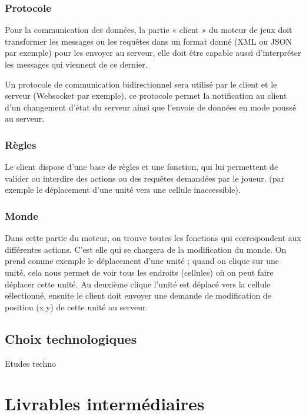 \documentclass[a4paper,10pt]{report}
\begin{document}
      \subsection{Protocole}

	Pour la communication des données, la partie « client » du moteur de jeux doit transformer les messages ou les requêtes dans un format donné (XML ou JSON par exemple) pour les envoyer au serveur, elle doit être capable aussi d’interpréter les messages qui viennent de ce dernier.

	Un protocole de communication bidirectionnel sera utilisé par le client et le serveur (Websocket par exemple), ce protocole permet la notification au client d’un changement d’état du serveur ainsi que l’envoie de données en mode poussé au serveur.

      \subsection{Règles}

	Le client dispose d’une base de règles et une fonction, qui lui permettent de valider ou interdire des actions ou des requêtes demandées par le joueur. (par exemple le déplacement d’une unité vers une cellule inaccessible).

      \subsection{Monde}

	Dans cette partie du moteur, on trouve toutes les fonctions qui correspondent aux différentes actions. C'est elle qui se chargera de la modification du monde. On prend comme exemple le déplacement d’une unité ; quand on clique sur une unité, cela nous permet de voir tous les endroits (cellules) où on peut faire déplacer cette unité. Au deuxième clique l’unité est déplacé vers la cellule sélectionné, ensuite le client doit envoyer une demande de modification de position (x,y) de cette unité au serveur.


    \section{Choix technologiques}

      Etudes techno



  \chapter{Livrables intermédiaires}
\end{document}
